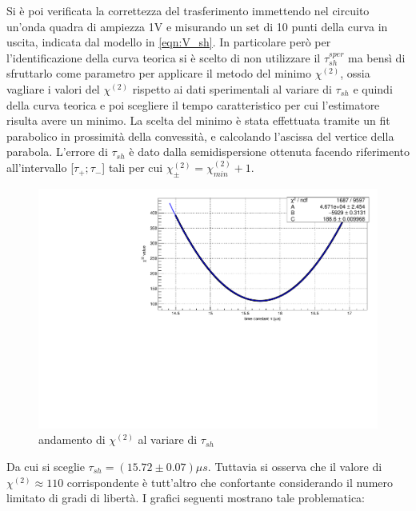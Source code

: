 \documentclass{article}
\begin{document}
Si è poi verificata la correttezza del trasferimento immettendo nel circuito un'onda quadra di ampiezza 1V e misurando un set di 10 punti 
della curva in uscita, indicata dal modello in \ref{eqn:V_sh}. In particolare però per l'identificazione della curva teorica si è 
scelto di non utilizzare il $\tau_{sh}^{sper}$ ma bensì di sfruttarlo come parametro per applicare il metodo del minimo $\chi^{(2)}$, 
ossia vagliare i valori del $\chi^{(2)}$ rispetto ai dati sperimentali al variare di $\tau_{sh}$ e quindi
della curva teorica e poi scegliere il tempo caratteristico per cui l'estimatore risulta avere un minimo. 
La scelta del minimo è stata effettuata tramite un fit parabolico in prossimità della convessità, e calcolando l'ascissa del 
vertice della parabola.
L'errore di $\tau_{sh}$ è dato dalla semidispersione ottenuta facendo riferimento all'intervallo [$\tau_+ ; \tau_-$] 
tali per cui $\chi^{(2)}_{\pm} = \chi^{(2)}_{min} + 1$.

\begin{center}
    \begin{figure}[H]
    \centering
    \includegraphics[scale=0.375, angle=0]{chi_forma_no_pz.pdf}
    \caption{andamento di $\chi^{(2)}$ al variare di $\tau_{sh}$}
    \label{fig:chi_forma_no_pz}
    \end{figure}
\end{center}
Da cui si sceglie $\tau_{sh} = (15.72\pm 0.07) \mu s$.  Tuttavia si osserva che
il valore di $\chi^{(2)} \approx 110 $ corrispondente è tutt'altro che confortante 
considerando il numero limitato di gradi di libertà. I grafici seguenti
mostrano tale problematica:
\end{document}
